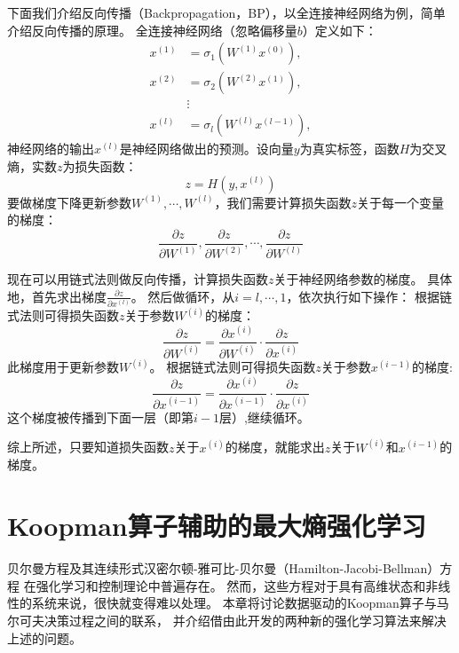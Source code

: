 \documentclass[AutoFakeBold]{LZUThesis}
\begin{document}
下面我们介绍反向传播（Backpropagation，BP），以全连接神经网络为例，简单介绍反向传播的原理。
全连接神经网络（忽略偏移量$b$）定义如下：
\begin{align*}
  x^{(1)} &= \sigma_1 (W^{(1)} x^{(0)}), \\
  x^{(2)} &= \sigma_2 (W^{(2)} x^{(1)}), \\
       &\vdots                           \\
  x^{(l)} &= \sigma_l (W^{(l)} x^{(l - 1)}),
\end{align*}
神经网络的输出$x^{(l)}$是神经网络做出的预测。设向量$y$为真实标签，函数$H$为交叉熵，实数$z$为损失函数：
\begin{equation}
  z = H(y, x^{(l)})
\end{equation}
要做梯度下降更新参数$W^{(1)}, \cdots, W^{(l)}$，我们需要计算损失函数$z$关于每一个变量的梯度：
\begin{equation}
  \frac{\partial z}{\partial W^{(1)}}, \frac{\partial z}{\partial W^{(2)}}, 
  \cdots, \frac{\partial z}{\partial W^{(l)}}
\end{equation}

现在可以用链式法则做反向传播，计算损失函数$z$关于神经网络参数的梯度。
具体地，首先求出梯度$\frac{\partial z}{\partial x^{(l)}}$。
然后做循环，从$i = l, \cdots, 1$，依次执行如下操作：
根据链式法则可得损失函数$z$关于参数$W^{(i)}$的梯度：
\begin{equation}
  \frac{\partial z}{\partial W^{(i)}} = \frac{\partial x^{(i)}}{\partial W^{(i)}} 
  \cdot \frac{\partial z}{\partial x^{(i)}}
\end{equation}
此梯度用于更新参数$W^{(i)}$。
根据链式法则可得损失函数$z$关于参数$x^{(i - 1)}$的梯度:
\begin{equation}
  \frac{\partial z}{\partial x^{(i - 1)}} = \frac{\partial x^{(i)}}{\partial x^{(i - 1)}} 
  \cdot \frac{\partial z}{\partial x^{(i)}}
\end{equation}
这个梯度被传播到下面一层（即第$i - 1$层）,继续循环。

综上所述，只要知道损失函数$z$关于$x^{(i)}$的梯度，就能求出$z$关于$W^{(i)}$和$x^{(i - 1)}$的梯度。

\chapter{Koopman算子辅助的最大熵强化学习}

贝尔曼方程及其连续形式汉密尔顿-雅可比-贝尔曼（Hamilton-Jacobi-Bellman）方程
在强化学习和控制理论中普遍存在。
然而，这些方程对于具有高维状态和非线性的系统来说，很快就变得难以处理。
本章将讨论数据驱动的Koopman算子与马尔可夫决策过程之间的联系，
并介绍借由此开发的两种新的强化学习算法来解决上述的问题。
\end{document}
